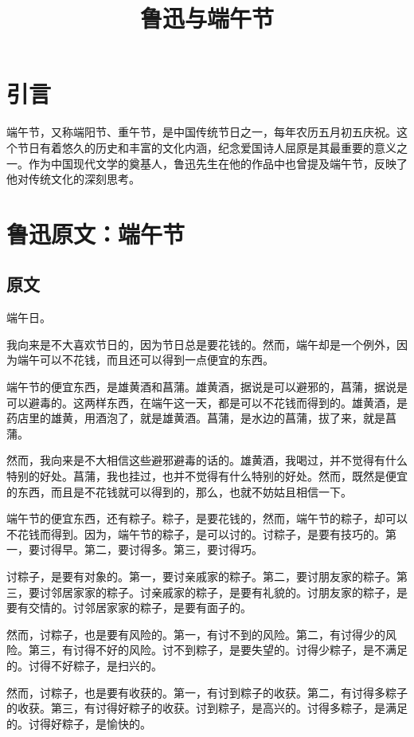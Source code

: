 \documentclass[12pt,a4paper]{article}
\title{鲁迅与端午节}
\author{}
\date{}
\begin{document}
\maketitle

\section{引言}

端午节，又称端阳节、重午节，是中国传统节日之一，每年农历五月初五庆祝。这个节日有着悠久的历史和丰富的文化内涵，纪念爱国诗人屈原是其最重要的意义之一。作为中国现代文学的奠基人，鲁迅先生在他的作品中也曾提及端午节，反映了他对传统文化的深刻思考。

\section{鲁迅原文：端午节}

\subsection{原文}

端午日。

我向来是不大喜欢节日的，因为节日总是要花钱的。然而，端午却是一个例外，因为端午可以不花钱，而且还可以得到一点便宜的东西。

端午节的便宜东西，是雄黄酒和菖蒲。雄黄酒，据说是可以避邪的，菖蒲，据说是可以避毒的。这两样东西，在端午这一天，都是可以不花钱而得到的。雄黄酒，是药店里的雄黄，用酒泡了，就是雄黄酒。菖蒲，是水边的菖蒲，拔了来，就是菖蒲。

然而，我向来是不大相信这些避邪避毒的话的。雄黄酒，我喝过，并不觉得有什么特别的好处。菖蒲，我也挂过，也并不觉得有什么特别的好处。然而，既然是便宜的东西，而且是不花钱就可以得到的，那么，也就不妨姑且相信一下。

端午节的便宜东西，还有粽子。粽子，是要花钱的，然而，端午节的粽子，却可以不花钱而得到。因为，端午节的粽子，是可以讨的。讨粽子，是要有技巧的。第一，要讨得早。第二，要讨得多。第三，要讨得巧。

讨粽子，是要有对象的。第一，要讨亲戚家的粽子。第二，要讨朋友家的粽子。第三，要讨邻居家家的粽子。讨亲戚家的粽子，是要有礼貌的。讨朋友家的粽子，是要有交情的。讨邻居家家的粽子，是要有面子的。

然而，讨粽子，也是要有风险的。第一，有讨不到的风险。第二，有讨得少的风险。第三，有讨得不好的风险。讨不到粽子，是要失望的。讨得少粽子，是不满足的。讨得不好粽子，是扫兴的。

然而，讨粽子，也是要有收获的。第一，有讨到粽子的收获。第二，有讨得多粽子的收获。第三，有讨得好粽子的收获。讨到粽子，是高兴的。讨得多粽子，是满足的。讨得好粽子，是愉快的。
\end{document}
